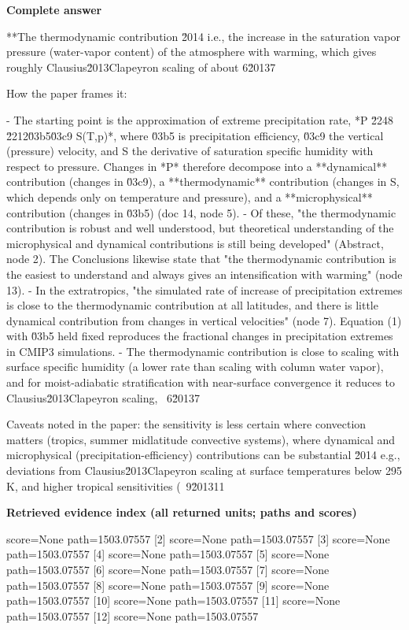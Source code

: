 \documentclass[10pt]{article}
\begin{document}
\textbf{Complete answer}
\begin{AnswerText}
**The thermodynamic contribution \u2014 i.e., the increase in the saturation vapor pressure (water-vapor content) of the atmosphere with warming, which gives roughly Clausius\u2013Clapeyron scaling of about 6\u20137 %

How the paper frames it:

- The starting point is the approximation of extreme precipitation rate, *P \u2248 \u2212\u03b5{\u03c9 S(T,p)}*, where \u03b5 is precipitation efficiency, \u03c9 the vertical (pressure) velocity, and S the derivative of saturation specific humidity with respect to pressure. Changes in *P* therefore decompose into a **dynamical** contribution (changes in \u03c9), a **thermodynamic** contribution (changes in S, which depends only on temperature and pressure), and a **microphysical** contribution (changes in \u03b5) (doc 14, node 5).
- Of these, "the thermodynamic contribution is robust and well understood, but theoretical understanding of the microphysical and dynamical contributions is still being developed" (Abstract, node 2). The Conclusions likewise state that "the thermodynamic contribution is the easiest to understand and always gives an intensification with warming" (node 13).
- In the extratropics, "the simulated rate of increase of precipitation extremes is close to the thermodynamic contribution at all latitudes, and there is little dynamical contribution from changes in vertical velocities" (node 7). Equation (1) with \u03b5 held fixed reproduces the fractional changes in precipitation extremes in CMIP3 simulations.
- The thermodynamic contribution is close to scaling with surface specific humidity (a lower rate than scaling with column water vapor), and for moist-adiabatic stratification with near-surface convergence it reduces to Clausius\u2013Clapeyron scaling, ~6\u20137 %

Caveats noted in the paper: the sensitivity is less certain where convection matters (tropics, summer midlatitude convective systems), where dynamical and microphysical (precipitation-efficiency) contributions can be substantial \u2014 e.g., deviations from Clausius\u2013Clapeyron scaling at surface temperatures below 295 K, and higher tropical sensitivities (~9\u201311 %
\end{AnswerText}

\textbf{Retrieved evidence index (all returned units; paths and scores) }
\begin{EvidenceText}
[1] score=None path=1503.07557
[2] score=None path=1503.07557
[3] score=None path=1503.07557
[4] score=None path=1503.07557
[5] score=None path=1503.07557
[6] score=None path=1503.07557
[7] score=None path=1503.07557
[8] score=None path=1503.07557
[9] score=None path=1503.07557
[10] score=None path=1503.07557
[11] score=None path=1503.07557
[12] score=None path=1503.07557
\end{EvidenceText}
\end{document}
